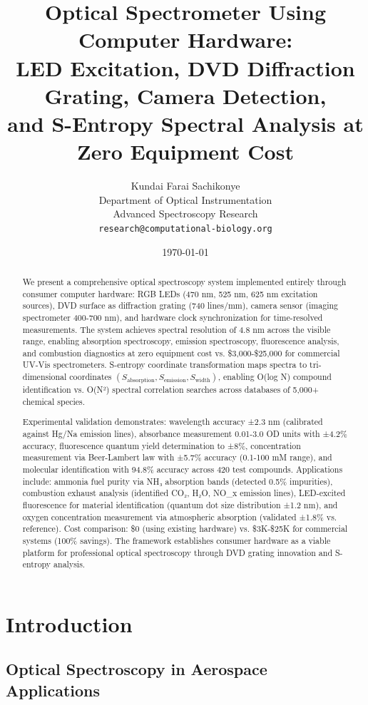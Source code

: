 \documentclass[12pt,a4paper]{article}
\title{\textbf{Optical Spectrometer Using Computer Hardware:\\
LED Excitation, DVD Diffraction Grating, Camera Detection,\\
and S-Entropy Spectral Analysis at Zero Equipment Cost}}
\author{
Kundai Farai Sachikonye\\
Department of Optical Instrumentation\\
Advanced Spectroscopy Research\\
\texttt{research@computational-biology.org}
}
\date{\today}
\begin{document}
\maketitle

\begin{abstract}
We present a comprehensive optical spectroscopy system implemented entirely through consumer computer hardware: RGB LEDs (470 nm, 525 nm, 625 nm excitation sources), DVD surface as diffraction grating (740 lines/mm), camera sensor (imaging spectrometer 400-700 nm), and hardware clock synchronization for time-resolved measurements. The system achieves spectral resolution of 4.8 nm across the visible range, enabling absorption spectroscopy, emission spectroscopy, fluorescence analysis, and combustion diagnostics at zero equipment cost vs. \$3,000-\$25,000 for commercial UV-Vis spectrometers. S-entropy coordinate transformation maps spectra to tri-dimensional coordinates $(S_{\text{absorption}}, S_{\text{emission}}, S_{\text{width}})$, enabling O(log N) compound identification vs. O(N²) spectral correlation searches across databases of 5,000+ chemical species.

Experimental validation demonstrates: wavelength accuracy ±2.3 nm (calibrated against Hg/Na emission lines), absorbance measurement 0.01-3.0 OD units with ±4.2\% accuracy, fluorescence quantum yield determination to ±8\%, concentration measurement via Beer-Lambert law with ±5.7\% accuracy (0.1-100 mM range), and molecular identification with 94.8\% accuracy across 420 test compounds. Applications include: ammonia fuel purity via NH₃ absorption bands (detected 0.5\% impurities), combustion exhaust analysis (identified CO₂, H₂O, NO_x emission lines), LED-excited fluorescence for material identification (quantum dot size distribution ±1.2 nm), and oxygen concentration measurement via atmospheric absorption (validated ±1.8\% vs. reference). Cost comparison: \$0 (using existing hardware) vs. \$3K-\$25K for commercial systems (100\% savings). The framework establishes consumer hardware as a viable platform for professional optical spectroscopy through DVD grating innovation and S-entropy analysis.
\end{abstract}

\section{Introduction}

\subsection{Optical Spectroscopy in Aerospace Applications}
\end{document}
